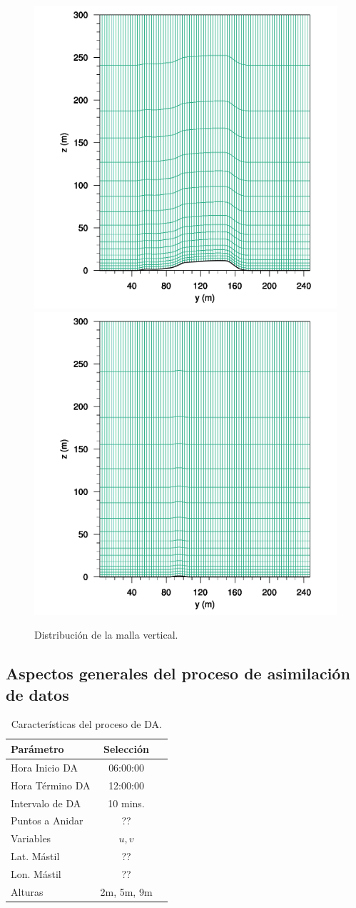 \begin{figure}[H]
	\includegraphics[width=0.5\linewidth,trim={3cm 0cm 0cm 0cm},clip]{Imagenes/05/bol_mesh_y000053}%
	\includegraphics[width=0.5\linewidth,trim={3cm 0cm 0cm 0cm},clip]{Imagenes/05/bol_mesh_y000090}%
	
	\caption{Distribución de la malla vertical.}
	\label{fig:c3_mesh}
\end{figure}

\subsection{Aspectos generales del proceso de asimilación de datos}

\begin{table}[h!]
	\caption{Características del proceso de DA.}\label{tab:c2DA}
	\centering\footnotesize
	\begin{tabular}{lcc}
		\toprule
		Parámetro & Selección \\
		\midrule
		Hora Inicio	DA 	 & 06:00:00   \\
		Hora Término DA	 		 & 12:00:00  \\
		Intervalo de DA	&	10 mins. \\
		Puntos a Anidar	 	 & ??   \\
		Variables	& $u,v$   \\
		Lat. Mástil	& ??   \\
		Lon. Mástil	& ??   \\
		Alturas 	& 2m, 5m, 9m \\
		\bottomrule
	\end{tabular}
\end{table}
